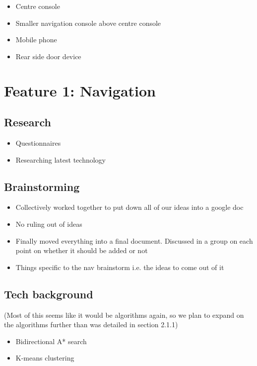 \documentclass{article}
\begin{document}
    \begin{itemize}
		\item Centre console
        \item Smaller navigation console above centre console
        \item Mobile phone
        \item Rear side door device
	\end{itemize}
\section{Feature 1: Navigation}
\subsection{Research}
  \begin{itemize}
    \item Questionnaires
    \item Researching latest technology
  \end{itemize}
\subsection{Brainstorming}
	\begin{itemize}
		\item Collectively worked together to put down all of our ideas into a google doc
		\item No ruling out of ideas
		\item Finally moved everything into a final document. Discussed in a group on each point on whether it should be added or not
        \item Things specific to the nav brainstorm i.e. the ideas to come out of it
	\end{itemize}
\subsection{Tech background}
(Most of this seems like it would be algorithms again, so we plan to expand on the algorithms further than was detailed in section 2.1.1)
  \begin{itemize}
    \item Bidirectional A* search
    \item K-means clustering
  \end{itemize}
\end{document}
